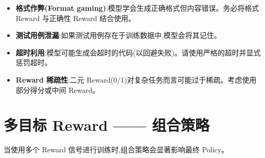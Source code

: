 \begin{warningbox}
\begin{itemize}
  \item \textbf{格式作弊(Format gaming)}:模型学会生成正确格式但内容错误。务必将格式 Reward 与正确性 Reward 结合使用。
  \item \textbf{测试用例泄漏}:如果测试用例存在于训练数据中,模型会将其记住。
  \item \textbf{超时利用}:模型可能生成会超时的代码(以回避失败)。请使用严格的超时并显式惩罚超时。
  \item \textbf{Reward 稀疏性}:二元 Reward(0/1)对复杂任务而言可能过于稀疏。考虑使用部分得分或中间 Reward。
\end{itemize}
\end{warningbox}

\section{多目标 Reward —— 组合策略}
\label{sec:multi-objective-rewards}

当使用多个 Reward 信号进行训练时,组合策略会显著影响最终 Policy。

